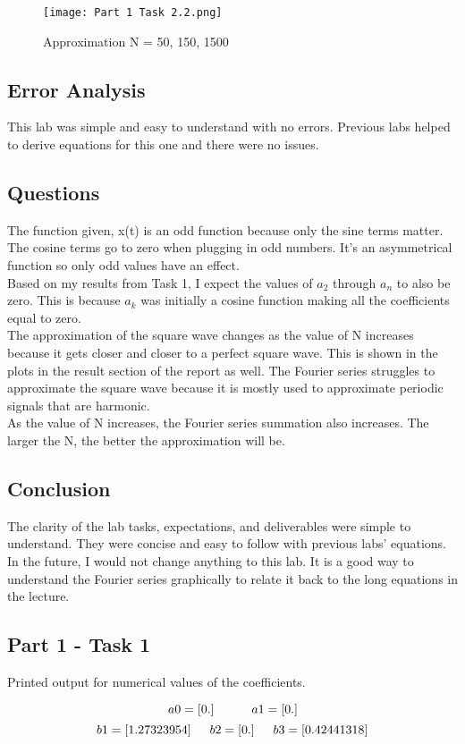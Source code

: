 \documentclass[12pt]{report}
\begin{document}
\begin{figure}[ht]
\begin{center}
\texttt{[image: Part 1 Task 2.2.png]}
\caption{Approximation N = 50, 150, 1500}
\end{center}
\end{figure}

\clearpage

\section{Error Analysis}
This lab was simple and easy to understand with no errors. Previous labs helped to derive equations for this one and there were no issues. 

\section{Questions}
The function given, x(t) is an odd function because only the sine terms matter. The cosine terms go to zero when plugging in odd numbers. It's an asymmetrical function so only odd values have an effect. \\

\noindent Based on my results from Task 1, I expect the values of $a_2$ through $a_n$ to also be zero. This is because $a_k$ was initially a cosine function making all the coefficients equal to zero. \\

\noindent The approximation of the square wave changes as the value of N increases because it gets closer and closer to a perfect square wave. This is shown in the plots in the result section of the report as well. The Fourier series struggles to approximate the square wave because it is mostly used to approximate periodic signals that are harmonic. \\

\noindent As the value of N increases, the Fourier series summation also increases. The larger the N, the better the approximation will be. 

\section{Conclusion}
The clarity of the lab tasks, expectations, and deliverables were simple to understand. They were concise and easy to follow with previous labs' equations. In the future, I would not change anything to this lab. It is a good way to understand the Fourier series graphically to relate it back to the long equations in the lecture. 

\begin{appendices}
\chapter{Part 1 - Task 1}
Printed output for numerical values of the coefficients.

\[ a0 =  [0.] \indent \indent a1 =  [0.]\]
\[b1 =  [1.27323954] \indent b2 =  [0.] \indent b3 =  [0.42441318]\]


\end{appendices}
\end{document}
